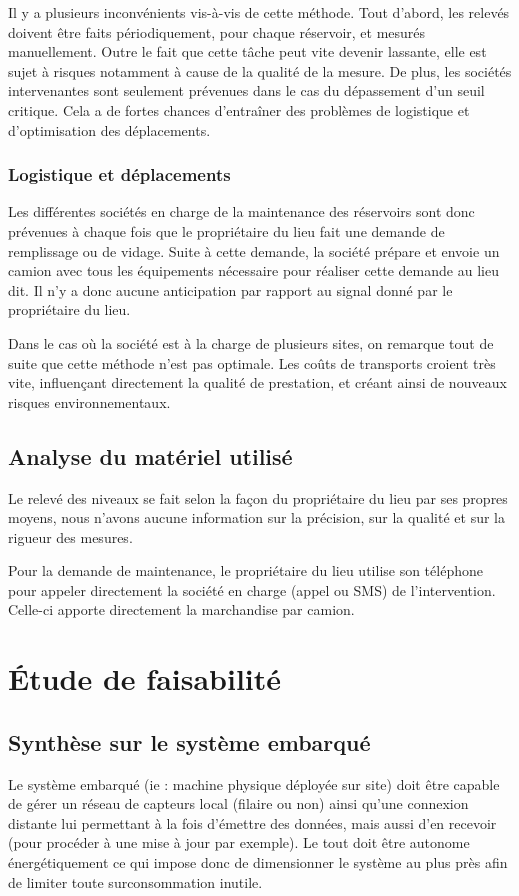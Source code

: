 \documentclass{article}
\begin{document}
Il y a plusieurs inconvénients vis-à-vis de cette méthode. Tout d’abord,
les relevés doivent être faits périodiquement, pour chaque réservoir,
et mesurés manuellement. Outre le fait que cette tâche peut vite
devenir lassante, elle est sujet à risques notamment à cause de la
qualité de la mesure. De plus, les sociétés intervenantes sont
seulement prévenues dans le cas du dépassement d’un seuil critique.
Cela a de fortes chances d'entraîner des problèmes de
logistique et d’optimisation des déplacements. 


\subsubsection{Logistique et déplacements}
Les différentes sociétés en charge de la maintenance des réservoirs sont
donc prévenues à chaque fois que le propriétaire du lieu fait une
demande de remplissage ou de vidage. Suite à cette demande, la société
prépare et envoie un camion avec tous les équipements nécessaire pour
réaliser cette demande au lieu dit.  Il n’y a donc aucune anticipation
par rapport au signal donné par le propriétaire du lieu.

Dans le cas où la société est à la charge de plusieurs sites, on
remarque tout de suite que cette méthode n’est pas optimale. Les coûts
de transports croient très vite, influençant directement la qualité de
prestation, et créant ainsi de nouveaux risques environnementaux.

\subsection{Analyse du matériel utilisé}
Le relevé des niveaux se fait selon la façon du propriétaire du lieu
par ses propres moyens, nous n’avons aucune information sur la
précision, sur la qualité et sur la rigueur des mesures.

Pour la demande de maintenance, le propriétaire du lieu utilise son
téléphone pour appeler directement la société en charge (appel ou SMS)
de l’intervention. Celle-ci apporte directement la marchandise par
camion.

\section{Étude de faisabilité}
\subsection{Synthèse sur le système embarqué}
Le système embarqué (ie : machine physique déployée sur site) doit être
capable de gérer un réseau de capteurs local (filaire ou non) ainsi
qu’une connexion distante lui permettant à la fois d’émettre des
données, mais aussi d’en recevoir (pour procéder à une mise à jour par
exemple). Le tout doit être autonome énergétiquement ce qui impose donc
de dimensionner le système au plus près afin de limiter toute
surconsommation inutile.
\end{document}
